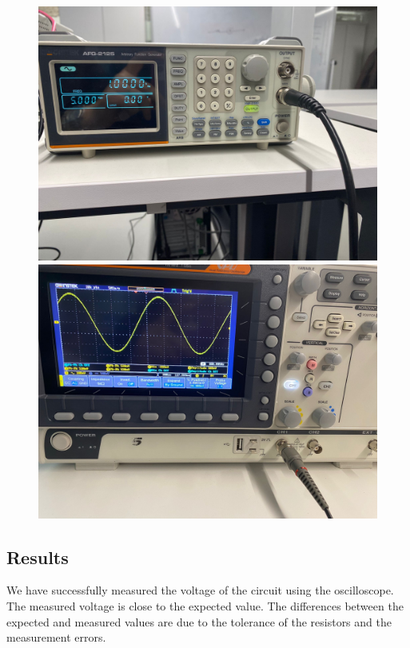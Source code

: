 \begin{enumerate}
    \begin{figure}[h]
        \centering
        \begin{minipage}{.5\textwidth}
            \centering
            \includegraphics[width=.9\linewidth]{assets/IMG-20240307-WA0010.jpg}
        \end{minipage}%
        \begin{minipage}{.5\textwidth}
            \centering
            \includegraphics[width=.9\linewidth]{assets/IMG-20240307-WA0017.jpg}
        \end{minipage}
    \end{figure}
\end{enumerate}

\subsection{Results}
We have successfully measured the voltage of the circuit using the oscilloscope. The measured voltage is close to the expected value. The differences between the expected and measured values are due to the tolerance of the resistors and the measurement errors.

\newpage
\thispagestyle{plain}
